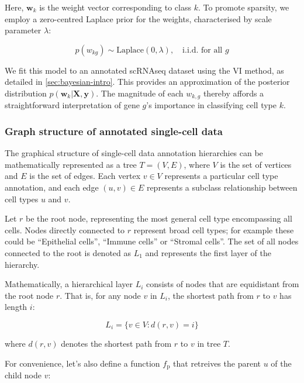Here, $\mathbf{w}_k$ is the weight vector corresponding to class $k$. To promote sparsity, we employ a zero-centred Laplace prior for the weights, characterised by scale parameter $\lambda$:

\begin{equation}
    \label{eq:logistic-regression-prior}
    p(w_{kg}) \sim \text{Laplace}(0, \lambda),\quad\text{i.i.d. for all } g 
\end{equation}

We fit this model to an annotated \ac{scRNAseq} dataset using the \ac{VI} method, as detailed in \cref{sec:bayesian-intro}. This provides an approximation of the posterior distribution $p(\mathbf{w}_k | \mathbf{X}, \mathbf{y})$. The magnitude of each $w_{k,g}$ thereby affords a straightforward interpretation of gene $g$'s importance in classifying cell type $k$.

\subsubsection*{Graph structure of annotated single-cell data}

The graphical structure of single-cell data annotation hierarchies can be mathematically represented as a tree $T = (V, E)$, where $V$ is the set of vertices and $E$ is the set of edges. Each vertex $v \in V$ represents a particular cell type annotation, and each edge $(u, v) \in E$ represents a subclass relationship between cell types $u$ and $v$. 

Let $r$ be the root node, representing the most general cell type encompassing all cells. Nodes directly connected to $r$ represent broad cell types; for example these could be ``Epithelial cells'', ``Immune cells'' or ``Stromal cells''. The set of all nodes connected to the root is denoted as $L_1$ and represents the first layer of the hierarchy. 

Mathematically, a hierarchical layer $L_i$ consists of nodes that are equidistant from the root node $r$. That is, for any node $v$ in $L_i$, the shortest path from $r$ to $v$ has length $i$:

\begin{equation}
    L_i = \{v \in V : d(r, v) = i\}
\end{equation}

where $d(r,v)$ denotes the shortest path from $r$ to $v$ in tree $T$. 

For convenience, let's also define a function $f_{\text{p}}$  that retreives the parent $u$ of the child node $v$:

